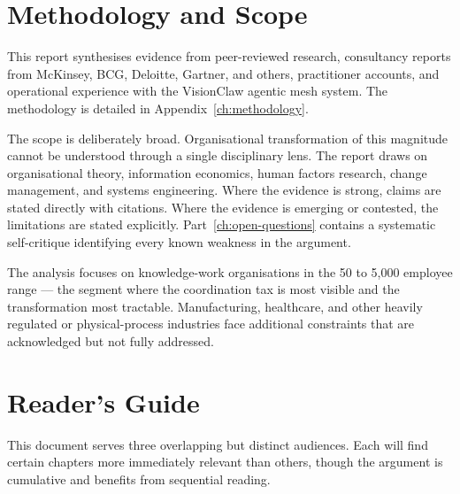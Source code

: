 \section{Methodology and Scope}

This report synthesises evidence from peer-reviewed research, consultancy reports from McKinsey, BCG, Deloitte, Gartner, and others, practitioner accounts, and operational experience with the VisionClaw agentic mesh system. The methodology is detailed in Appendix~\ref{ch:methodology}.

The scope is deliberately broad. Organisational transformation of this magnitude cannot be understood through a single disciplinary lens. The report draws on organisational theory, information economics, human factors research, change management, and systems engineering. Where the evidence is strong, claims are stated directly with citations. Where the evidence is emerging or contested, the limitations are stated explicitly. Part~\ref{ch:open-questions} contains a systematic self-critique identifying every known weakness in the argument.

The analysis focuses on knowledge-work organisations in the 50 to 5,000 employee range --- the segment where the coordination tax is most visible and the transformation most tractable. Manufacturing, healthcare, and other heavily regulated or physical-process industries face additional constraints that are acknowledged but not fully addressed.

\section{Reader's Guide}
\label{sec:readers-guide}

This document serves three overlapping but distinct audiences. Each will find certain chapters more immediately relevant than others, though the argument is cumulative and benefits from sequential reading.

